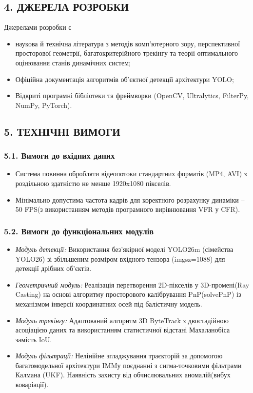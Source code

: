 \begin{unnumbered}
\subsection{4. ДЖЕРЕЛА РОЗРОБКИ}

Джерелами розробки є
\begin{itemize}
    \item наукова й технічна література з методів комп'ютерного зору, перспективної просторової геометрії,
    багатокритерійного трекінгу та теорії оптимального оцінювання станів динамічних систем;
    \item Офіційна документація алгоритмів об'єктної детекції архітектури \gls{YOLO};
    \item Відкриті програмні бібліотеки та фреймворки (OpenCV, Ultralytics, FilterPy, NumPy, PyTorch).
\end{itemize}


\subsection{5. ТЕХНІЧНІ ВИМОГИ}
\subsubsection{5.1. Вимоги до вхідних даних}

\begin{itemize}
    \item Система повинна обробляти відеопотоки стандартних форматів (MP4, AVI) з роздільною здатністю не менше 1920x1080 пікселів.
    \item Мінімально допустима частота кадрів для коректного розрахунку динаміки – 50 FPS(з використанням методів програмного вирівнювання VFR у CFR).
\end{itemize}

\subsubsection{5.2. Вимоги до функціональних модулів}
\begin{itemize}
    \item \textit{Модуль детекції:} Використання без'якірної моделі YOLO26m (сімейства \gls{YOLO}26) зі збільшеним розміром вхідного тензора (imgsz=1088) для детекції дрібних об'єктів.
    \item \textit{Геометричний модуль:} Реалізація перетворення 2D-пікселів у 3D-промені(Ray Casting) на основі алгоритму просторового калібрування \gls{PnP}(solvePnP) із механізмом інверсії координатних осей під балістичну модель.
    \item \textit{Модуль трекінгу:} Адаптований алгоритм 3D ByteTrack з двостадійною асоціацією даних та використанням статистичної відстані Махаланобіса замість \gls{IoU}.
    \item \textit{Модуль фільтрації:} Нелінійне згладжування траєкторій за допомогою багатомодельної архітектури \gls{IMM}у поєднанні з сигма-точковими фільтрами Калмана (\gls{UKF}). Наявність захисту від обчислювальних аномалій(вибух коваріації).
\end{itemize}


\end{unnumbered}
